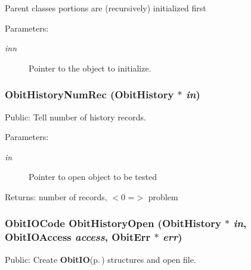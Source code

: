 Parent classes portions are (recursively) initialized first \begin{Desc}
\item[Parameters:]
\begin{description}
\item[{\em inn}]Pointer to the object to initialize. \end{description}
\end{Desc}
\subsubsection{ Obit\-History\-Num\-Rec ({\bf Obit\-History} $\ast$ {\em in})}\label{ObitHistory_8c_a20}


Public: Tell number of history records. 

\begin{Desc}
\item[Parameters:]
\begin{description}
\item[{\em in}]Pointer to open object to be tested \end{description}
\end{Desc}
\begin{Desc}
\item[Returns:]number of records, $<$0 =$>$ problem \end{Desc}
\subsubsection{\setlength{\rightskip}{0pt plus 5cm}Obit\-IOCode Obit\-History\-Open ({\bf Obit\-History} $\ast$ {\em in}, Obit\-IOAccess {\em access}, {\bf Obit\-Err} $\ast$ {\em err})}\label{ObitHistory_8c_a15}


Public: Create {\bf Obit\-IO}{\rm (p.\,\pageref{structObitIO})} structures and open file. 

